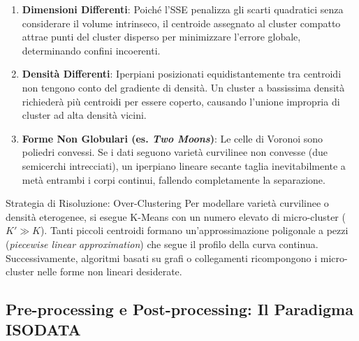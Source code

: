 \begin{enumerate}
    \item \textbf{Dimensioni Differenti}: Poiché l'SSE penalizza gli scarti quadratici senza considerare il volume intrinseco, il centroide assegnato al cluster compatto attrae punti del cluster disperso per minimizzare l'errore globale, determinando confini incoerenti.
    \item \textbf{Densità Differenti}: Iperpiani posizionati equidistantemente tra centroidi non tengono conto del gradiente di densità. Un cluster a bassissima densità richiederà più centroidi per essere coperto, causando l'unione impropria di cluster ad alta densità vicini.
    \item \textbf{Forme Non Globulari (es. \textit{Two Moons})}: Le celle di Voronoi sono poliedri convessi. Se i dati seguono varietà curvilinee non convesse (due semicerchi intrecciati), un iperpiano lineare secante taglia inevitabilmente a metà entrambi i corpi continui, fallendo completamente la separazione.
\end{enumerate}

\begin{noteblock}{Strategia di Risoluzione: Over-Clustering}
Per modellare varietà curvilinee o densità eterogenee, si esegue K-Means con un numero elevato di micro-cluster ($K' \gg K$). Tanti piccoli centroidi formano un'approssimazione poligonale a pezzi (\textit{piecewise linear approximation}) che segue il profilo della curva continua. Successivamente, algoritmi basati su grafi o collegamenti ricompongono i micro-cluster nelle forme non lineari desiderate.
\end{noteblock}

\FloatBarrier
\subsection{Pre-processing e Post-processing: Il Paradigma ISODATA}

